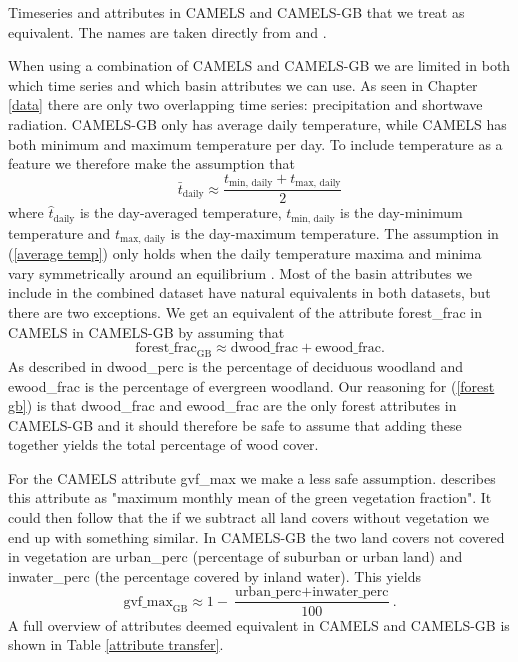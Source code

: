 \begin{table}
    \centering
        \caption[Common attributes and timeseries CAMELS and CAMELS-GB.]{Timeseries and attributes in CAMELS and CAMELS-GB that we treat as 
    equivalent. The names are taken directly from \citet{CAMELS_US} and \citet{CAMELS_GB}.}
    
    \label{attribute transfer}
\end{table}
When using a combination of CAMELS and CAMELS-GB we are limited in both which 
time series and which basin attributes we can use.
As seen in Chapter \ref{data} there are only two overlapping time series: precipitation 
and shortwave radiation. CAMELS-GB only has 
average daily temperature, while CAMELS has both minimum and maximum temperature 
per day. To include temperature as a feature we therefore make the assumption that 
\begin{equation}
    \bar{t}_\text{daily} \approx \frac{t_\text{min, daily} + t_\text{max, daily}}{2} \label{average temp}
\end{equation}
where $\hat{t}_\text{daily}$ is the day-averaged temperature, $t_\text{min, daily}$ is 
the day-minimum temperature and $t_\text{max, daily}$ is the day-maximum temperature.
The assumption in (\ref{average temp}) only holds when the daily temperature maxima 
and minima vary symmetrically around an equilibrium  \citationneeded.
Most of the basin attributes we include in the combined dataset have natural equivalents 
in both datasets, but there are two exceptions. We get an equivalent of the attribute 
forest\_frac in CAMELS in CAMELS-GB by assuming that
\begin{equation}
    \text{forest\_frac}_\text{GB} \approx \text{dwood\_frac} + \text{ewood\_frac}. \label{forest gb}
\end{equation}
As described in \citet{CAMELS_GB} dwood\_perc is the percentage of deciduous woodland 
and ewood\_frac is the percentage of evergreen woodland.
Our reasoning for (\ref{forest gb}) is that dwood\_frac and ewood\_frac are the only 
forest attributes in CAMELS-GB and it should therefore be safe to assume that adding 
these together yields the total percentage of wood cover.

For the CAMELS attribute gvf\_max we make a less safe assumption. \citet{CAMELS_US} 
describes this attribute as "maximum monthly mean of the green vegetation fraction". 
It could then follow that the if we subtract all land covers without vegetation 
we end up with something similar. In CAMELS-GB the two land covers not covered in 
vegetation are urban\_perc (percentage of suburban or urban land) and inwater\_perc 
(the percentage covered by inland water). This yields
\begin{equation}
    \text{gvf\_max}_\text{GB} \approx 1 - \frac{\text{urban\_perc} + \text{inwater\_perc}}{100}. \label{gvf gb}
\end{equation}
A full overview of attributes deemed equivalent in CAMELS and CAMELS-GB is shown in 
Table \ref{attribute transfer}.

